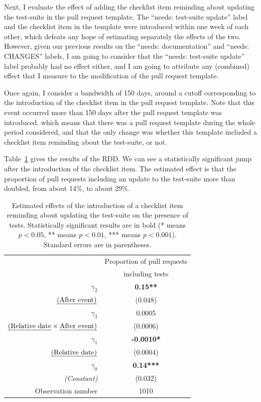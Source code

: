 Next, I evaluate the effect of adding the checklist item reminding about updating the test-suite in the pull request template.
The ``needs: test-suite update'' label and the checklist item in the template were introduced within one week of each other, which defeats any hope of estimating separately the effects of the two.
However, given our previous results on the ``needs: documentation'' and ``needs: CHANGES'' labels, I am going to consider that the ``needs: test-suite update'' label probably had no effect either, and I am going to attribute any (combined) effect that I measure to the modification of the pull request template.

Once again, I consider a bandwidth of 150 days, around a cutoff corresponding to the introduction of the checklist item in the pull request template.
Note that this event occurred more than 150 days after the pull request template was introduced, which means that there was a pull request template during the whole period considered, and that the only change was whether this template included a checklist item reminding about the test-suite, or not.

Table~\ref{tab:tests} gives the results of the RDD.
We can see a statistically significant jump after the introduction of the checklist item.
The estimated effect is that the proportion of pull requests including an update to the test-suite more than doubled, from about 14\%, to about 29\%.

\begin{table}
	\begin{center}
		\begin{tabular}{|r|c|}
			\hline
			& Proportion of pull requests \\
			& including tests \\
			\hline
			$\gamma_2$ & \textbf{0.15**} \\
			$\mbox{\emph{(After event)}}$ & (0.048) \\
			\hline
			$\gamma_3$ & 0.0005 \\
			$\mbox{\emph{(Relative date}} \times \mbox{\emph{After event)}}$ & (0.0006) \\
			\hline
			$\gamma_1$ & \textbf{-0.0010*} \\
			$\mbox{\emph{(Relative date)}}$ & (0.0004) \\
			\hline
			$\gamma_0$ & \textbf{0.14***} \\
			\emph{(Constant)} & (0.032) \\
			\hline
			Observation number & 1010 \\
			\hline
		\end{tabular}
		\caption{
			Estimated effects of the introduction of a checklist item reminding about updating the test-suite on the presence of tests.
			Statistically significant results are in bold (* means $p < 0.05$, ** means $p < 0.01$, *** means $p < 0.001$).
			Standard errors are in parentheses.
		}
		\label{tab:tests}
	\end{center}
\end{table}

